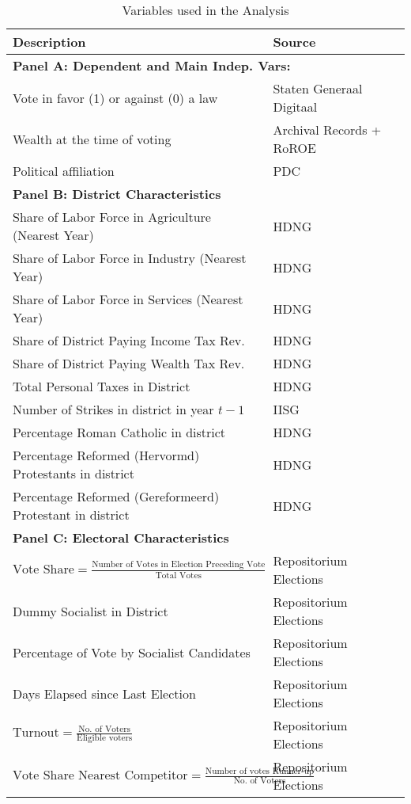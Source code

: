 \begin{table}[!ht]
\caption{Variables used in the Analysis}
    \label{tab:variables_table}
\footnotesize
    \centering
    \begin{tabular}{ll}
    \textbf{Description} & \textbf{Source} \\ \hline
    \multicolumn{2}{l}{\textbf{Panel A: Dependent and Main Indep. Vars:}} \\ \hline
    Vote in favor (1) or against (0) a law & Staten Generaal Digitaal\\ 
    Wealth at the time of voting & Archival Records + RoROE\\
    Political affiliation & PDC\\
    \multicolumn{2}{l}{\textbf{Panel B: District Characteristics}} \\ \hline
    Share of Labor Force in Agriculture (Nearest Year) & HDNG \\
    Share of Labor Force in Industry (Nearest Year) & HDNG \\
    Share of Labor Force in Services (Nearest Year) & HDNG \\
    Share of District Paying Income Tax Rev. & HDNG \\
    Share of District Paying Wealth Tax Rev. & HDNG \\
    Total Personal Taxes in District & HDNG \\
    Number of Strikes in district in year $t-1$ & IISG \\  
    Percentage Roman Catholic in district & HDNG \\
    Percentage Reformed (Hervormd) Protestants in district & HDNG \\
    Percentage Reformed (Gereformeerd) Protestant in district & HDNG \\
    \multicolumn{2}{l}{\textbf{Panel C: Electoral  Characteristics}} \\ \hline
    $\text{Vote Share} = \frac{\text{Number of Votes in Election Preceding Vote}}{\text{Total Votes}}$ & Repositorium Elections\\
    Dummy Socialist in District & Repositorium Elections\\
    Percentage of Vote by Socialist Candidates & Repositorium Elections\\ 
    Days Elapsed since Last Election & Repositorium Elections\\
    $\text{Turnout} = \frac{\text{No. of Voters}}{\text{Eligible voters}}$ & Repositorium Elections\\
    $\text{Vote Share Nearest Competitor} = \frac{\text{Number of votes Runner-up}}{\text{No. of Voters}}$ & Repositorium Elections\\

\end{tabular}
\end{table}
